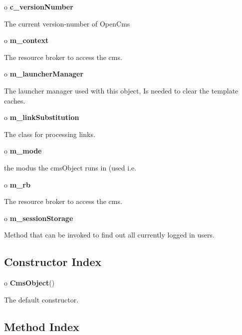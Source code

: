 \begin{description}
\item o {\bf c\_versionNumber}  

The current version-number of OpenCms  
\item o {\bf m\_context}  

The resource broker to access the cms.  
\item o {\bf m\_launcherManager}  

The launcher manager used with this object, Is needed to clear the template
caches.  
\item o {\bf m\_linkSubstitution}  

The class for processing links.  
\item o {\bf m\_mode}  

the modus the cmsObject runs in (used i.e.  
\item o {\bf m\_rb}  

The resource broker to access the cms.  
\item o {\bf m\_sessionStorage}  

Method that can be invoked to find out all currently logged in users. 
\end{description}

\subsection*{  Constructor Index }

\begin{description}
\item o {\bf CmsObject}()  

The default constructor. 
\end{description}

\subsection*{  Method Index }

